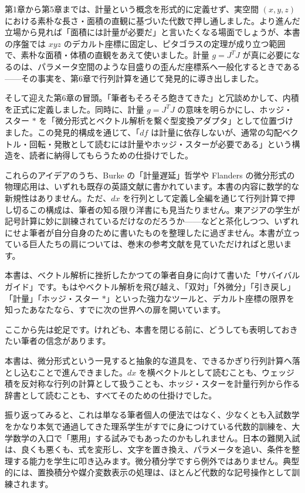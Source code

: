 \documentclass[a4paper,12pt,openany]{book}
\begin{document}
第1章から第5章までは、計量という概念を形式的に定義せず、実空間
\((x,y,z)\)
における素朴な長さ・面積の直観に基づいた代数で押し通しました。より進んだ立場から見れば「面積には計量が必要だ」と言いたくなる場面でしょうが、本書の序盤では
\(xyz\)
のデカルト座標に固定し、ピタゴラスの定理が成り立つ範囲で、素朴な面積・体積の直観をあえて使いました。計量
\(g = J^T J\)
が真に必要になるのは、パラメータ空間のような目盛りの歪んだ座標系へ一般化するときである——その事実を、第6章で行列計算を通じて発見的に導き出しました。

そして迎えた第6章の冒頭。「筆者もそろそろ飽きてきた」と冗談めかして、内積を正式に定義しました。同時に、計量
\(g = J^T J\) の意味を明らかにし、ホッジ・スター \(\ast\)
を「微分形式とベクトル解析を繫ぐ型変換アダプタ」として位置づけました。この発見的構成を通じて、「\(df\)
は計量に依存しないが、通常の勾配ベクトル・回転・発散として読むには計量やホッジ・スターが必要である」という構造を、読者に納得してもらうための仕掛けでした。

これらのアイデアのうち、Burke の「計量遅延」哲学や Flanders
の微分形式の物理応用は、いずれも既存の英語文献に書かれています。本書の内容に数学的な新規性はありません。ただ、\(dx\)
を行列として定義し全編を通じて行列計算で押し切るこの構成は、筆者の知る限り洋書にも見当たりません。東アジアの学生が記号計算に妙に訓練されているだけなのだろうか——などと茶化しつつ、いずれにせよ筆者が自分自身のために書いたものを整理したに過ぎません。本書が立っている巨人たちの肩については、巻末の参考文献を見ていただければと思います。

本書は、ベクトル解析に挫折したかつての筆者自身に向けて書いた「サバイバルガイド」です。もはやベクトル解析を飛び越え、「双対」「外微分」「引き戻し」「計量」「ホッジ・スター
\(\ast\)」といった強力なツールと、デカルト座標の限界を知ったあなたなら、すでに次の世界への扉を開いています。

ここから先は蛇足です。けれども、本書を閉じる前に、どうしても表明しておきたい筆者の信念があります。

本書は、微分形式という一見すると抽象的な道具を、できるかぎり行列計算へ落とし込むことで進んできました。\(dx\)
を横ベクトルとして読むことも、ウェッジ積を反対称な行列の計算として扱うことも、ホッジ・スターを計量行列から作る辞書として読むことも、すべてそのための仕掛けでした。

振り返ってみると、これは単なる筆者個人の便法ではなく、少なくとも入試数学をかなり本気で通過してきた理系学生がすでに身につけている代数的訓練を、大学数学の入口で「悪用」する試みでもあったのかもしれません。日本の難関入試は、良くも悪くも、式を変形し、文字を置き換え、パラメータを追い、条件を整理する能力を学生に叩き込みます。微分積分学ですら例外ではありません。典型的には、置換積分や媒介変数表示の処理は、ほとんど代数的な記号操作として訓練されます。
\end{document}
